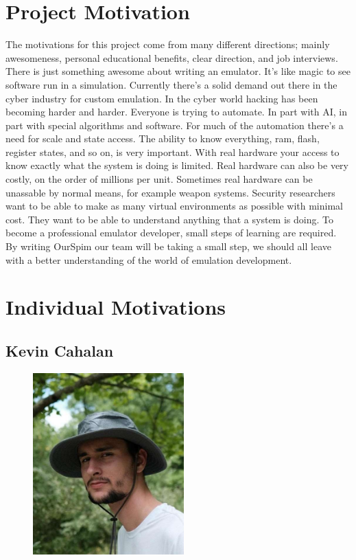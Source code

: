 \documentclass[parskip=half, fontsize=12pt]{scrartcl}
\begin{document}
\section{Project Motivation}
The motivations for this project come from many different directions; mainly awesomeness, personal educational benefits, clear direction, and job interviews. There is just something awesome about writing an emulator. It's like magic to see software run in a simulation. Currently there's a solid demand out there in the cyber industry for custom emulation. In the cyber world hacking has been becoming harder and harder. Everyone is trying to automate. In part with AI, in part with special algorithms and software. For much of the automation there's a need for scale and state access. The ability to know everything, ram, flash, register states, and so on, is very important. With real hardware your access to know exactly what the system is doing is limited. Real hardware can also be very costly, on the order of millions per unit. Sometimes real hardware can be unassable by normal means, for example weapon systems. Security researchers want to be able to make as many virtual environments as possible with minimal cost. They want to be able to understand anything that a system is doing. To become a professional emulator developer, small steps of learning are required. By writing OurSpim our team will be taking a small step, we should all leave with a better understanding of the world of emulation development.



\section{Individual Motivations}
\subsection{Kevin Cahalan}
\begin{figure}[H]
    \centering
    \includegraphics[height=7cm]{profile-kevin}
\end{figure}
\end{document}

